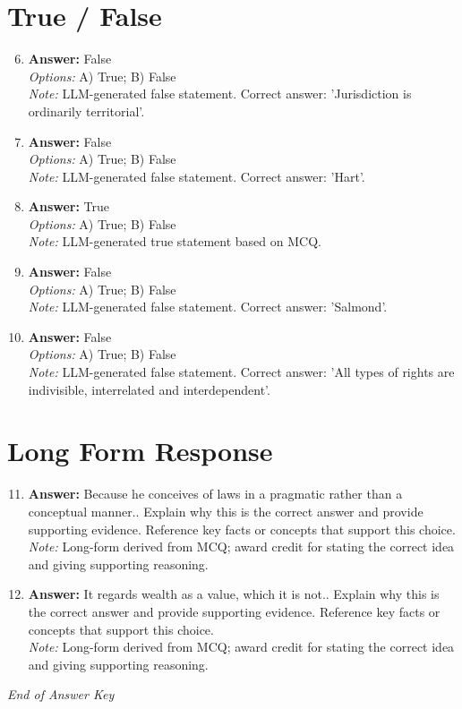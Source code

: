 \documentclass[12pt]{article}
\begin{document}
\section*{True / False}
\begin{enumerate}[label=\arabic*.]
\setcounter{enumi}{5}
\item \textbf{Answer:} False
\\ \textit{Options:} A) True; B) False
\\ \textit{Note:} LLM-generated false statement. Correct answer: 'Jurisdiction is ordinarily territorial'.
\item \textbf{Answer:} False
\\ \textit{Options:} A) True; B) False
\\ \textit{Note:} LLM-generated false statement. Correct answer: 'Hart'.
\item \textbf{Answer:} True
\\ \textit{Options:} A) True; B) False
\\ \textit{Note:} LLM-generated true statement based on MCQ.
\item \textbf{Answer:} False
\\ \textit{Options:} A) True; B) False
\\ \textit{Note:} LLM-generated false statement. Correct answer: 'Salmond'.
\item \textbf{Answer:} False
\\ \textit{Options:} A) True; B) False
\\ \textit{Note:} LLM-generated false statement. Correct answer: 'All types of rights are indivisible, interrelated and interdependent'.
\end{enumerate}

\section*{Long Form Response}
\begin{enumerate}[label=\arabic*.]
\setcounter{enumi}{10}
\item \textbf{Answer:} Because he conceives of laws in a pragmatic rather than a conceptual manner.. Explain why this is the correct answer and provide supporting evidence. Reference key facts or concepts that support this choice.
\\ \textit{Note:} Long-form derived from MCQ; award credit for stating the correct idea and giving supporting reasoning.
\item \textbf{Answer:} It regards wealth as a value, which it is not.. Explain why this is the correct answer and provide supporting evidence. Reference key facts or concepts that support this choice.
\\ \textit{Note:} Long-form derived from MCQ; award credit for stating the correct idea and giving supporting reasoning.
\end{enumerate}

\vfill
\noindent\textit{End of Answer Key}
\end{document}
